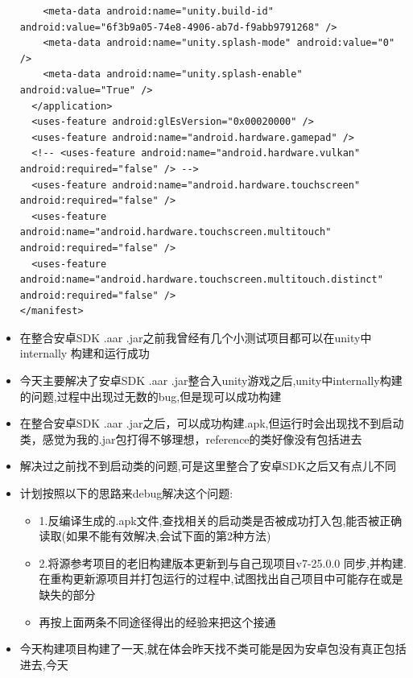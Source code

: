 \documentclass[9pt, b5paper]{article}
\begin{document}
\begin{itemize}
\begin{verbatim}
    <meta-data android:name="unity.build-id" android:value="6f3b9a05-74e8-4906-ab7d-f9abb9791268" />
    <meta-data android:name="unity.splash-mode" android:value="0" />
    <meta-data android:name="unity.splash-enable" android:value="True" />
  </application>
  <uses-feature android:glEsVersion="0x00020000" />
  <uses-feature android:name="android.hardware.gamepad" />
  <!-- <uses-feature android:name="android.hardware.vulkan" android:required="false" /> -->
  <uses-feature android:name="android.hardware.touchscreen" android:required="false" />
  <uses-feature android:name="android.hardware.touchscreen.multitouch" android:required="false" />
  <uses-feature android:name="android.hardware.touchscreen.multitouch.distinct" android:required="false" />
</manifest>
\end{verbatim}

\item 在整合安卓SDK .aar .jar之前我曾经有几个小测试项目都可以在unity中internally 构建和运行成功
\item 今天主要解决了安卓SDK .aar .jar整合入unity游戏之后,unity中internally构建的问题,过程中出现过无数的bug,但是现可以成功构建
\item 在整合安卓SDK .aar .jar之后，可以成功构建.apk,但运行时会出现找不到启动类，感觉为我的.jar包打得不够理想，reference的类好像没有包括进去
\item 解决过之前找不到启动类的问题,可是这里整合了安卓SDK之后又有点儿不同
\item 计划按照以下的思路来debug解决这个问题:
\begin{itemize}
\item 1.反编译生成的.apk文件,查找相关的启动类是否被成功打入包,能否被正确读取(如果不能有效解决,会试下面的第2种方法)
\item 2.将源参考项目的老旧构建版本更新到与自己现项目v7-25.0.0 同步,并构建.在重构更新源项目并打包运行的过程中,试图找出自己项目中可能存在或是缺失的部分
\item 再按上面两条不同途径得出的经验来把这个接通
\end{itemize}
\item 今天构建项目构建了一天,就在体会昨天找不类可能是因为安卓包没有真正包括进去,今天
\end{itemize}
\end{document}
